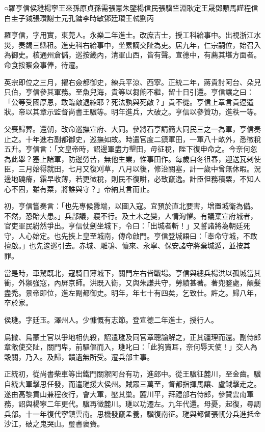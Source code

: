 
\begin{pinyinscope}
○羅亨信侯璡楊寧王來孫原貞孫需張憲朱鑒楊信民張驥竺淵耿定王晟鄧顒馬謹程信白圭子鉞張瓚謝士元孔鏞李時敏鄧廷瓚王軾劉丙

羅亨信，字用實，東莞人。永樂二年進士。改庶吉士，授工科給事中。出視浙江水災，奏蠲三縣租。進吏科右給事中，坐累謫交阯為吏。居九年，仁宗嗣位，始召入為御史。核通州倉儲，巡按畿內，清軍山西，皆有聲。宣德中，有薦其堪方面者。命食按察僉事俸，待遷。

英宗即位之三月，擢右僉都御史，練兵平涼、西寧。正統二年，蔣貴討阿台、朵兒只伯，亨信參其軍務。至魚兒海，貴等以芻餉不繼，留十日引還。亨信讓之曰：「公等受國厚恩，敢臨敵退縮耶？死法孰與死敵？」貴不從。亨信上章言貴逗遛狀。帝以其章示監督尚書王驥等。明年進兵，大破之。亨信以參贊功，進秩一等。

父喪歸葬。還朝，改命巡撫宣府、大同。參將石亨請簡大同民三之一為軍，亨信奏止之。十年進右副都御史，巡撫如故。時遣官度二鎮軍田，一軍八十畝外，悉徵稅五升。亨信言：「文皇帝時，詔邊軍盡力墾田，毋征稅，陛下復申命之。今奈何忽為此舉？塞上諸軍，防邊勞苦，無他生業，惟事田作。每歲自冬徂春，迎送瓦剌使臣，三月始得就田，七月又復刈草，八月以後，修治關塞，計一歲中曾無休暇。況邊地磽瘠，霜早收薄，若更徵稅，則民不復畊，必致竄逸。計臣但務積粟，不知人心不固，雖有粟，將誰與守？」帝納其言而止。

初，亨信嘗奏言：「也先專候釁端，以圖入寇。宜預於直北要害，增置城衛為備。不然，恐貽大患。」兵部議，寢不行。及土木之變，人情洶懼。有議棄宣府城者，官吏軍民紛然爭出。亨信仗劍坐城下，令曰：「出城者斬！」又誓諸將為朝廷死守，人心始定。也先挾上皇至城南，傳命啟門。亨信登城語曰：「奉命守城，不敢擅啟。」也先逡巡引去。赤城、雕鶚、懷來、永寧、保安諸守將棄城遁，並按其罪。

當是時，車駕既北，寇騎日薄城下，關門左右皆戰場。亨信與總兵楊洪以孤城當其衝，外禦強寇，內屏京師。洪既入衛，又與朱謙共守，勞績甚著。著兜鍪處，顛髮盡禿。景帝即位，進左副都御史。明年，年七十有四矣，乞致仕。許之。歸八年，卒於家。

侯璡。字廷玉。澤州人。少慷慨有志節。登宣德二年進士，授行人。

烏撒、烏蒙土官以爭地相仇殺，詔遣璡及同官章聰諭解之，正其疆理而還。副侍郎章敞使交阯，關門卑，前驅傴而入，璡叱曰：「此狗竇耳，奈何辱天使！」交人為毀關，乃入。及歸，饋遺無所受。遷兵部主事。

正統初，從尚書柴車等出鐵門關禦阿台有功，進郎中。從王驥征麓川，至金齒。驥自統大軍擊思任發，而遣璡援大侯州。賊眾三萬至，督都指揮馬讓、盧鉞擊走之。遂由高黎貢山兼程夜行，會大軍，壓其巢。麓川平，拜禮部右侍郎，參贊雲南軍務，詔與楊寧二年更代。驥再徵麓川。璡以功遷左。九年代還。母憂，起復，尋調兵部。十一年復代寧鎮雲南。思機發竄孟養，驥復南征。璡與都督張軏分兵進抵金沙江，破之鬼哭山。璽書褒賚。


\end{pinyinscope}
